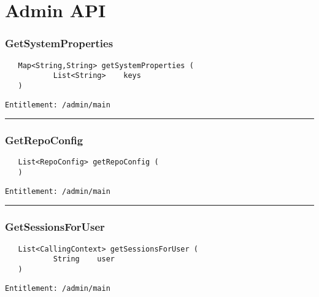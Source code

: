 \chapter{Admin API}

\subsection{GetSystemProperties}
\label{Api:GetSystemProperties}
\begin{verbatim}
   Map<String,String> getSystemProperties (
           List<String>    keys
   )
\end{verbatim}
\begin{Verbatim}[fontsize=\small, formatcom=\color{Maroon}]
  Entitlement: /admin/main
\end{Verbatim}



\rule{12cm}{2pt}
\subsection{GetRepoConfig}
\label{Api:GetRepoConfig}
\begin{verbatim}
   List<RepoConfig> getRepoConfig (
   )
\end{verbatim}
\begin{Verbatim}[fontsize=\small, formatcom=\color{Maroon}]
  Entitlement: /admin/main
\end{Verbatim}



\rule{12cm}{2pt}
\subsection{GetSessionsForUser}
\label{Api:GetSessionsForUser}
\begin{verbatim}
   List<CallingContext> getSessionsForUser (
           String    user
   )
\end{verbatim}
\begin{Verbatim}[fontsize=\small, formatcom=\color{Maroon}]
  Entitlement: /admin/main
\end{Verbatim}



